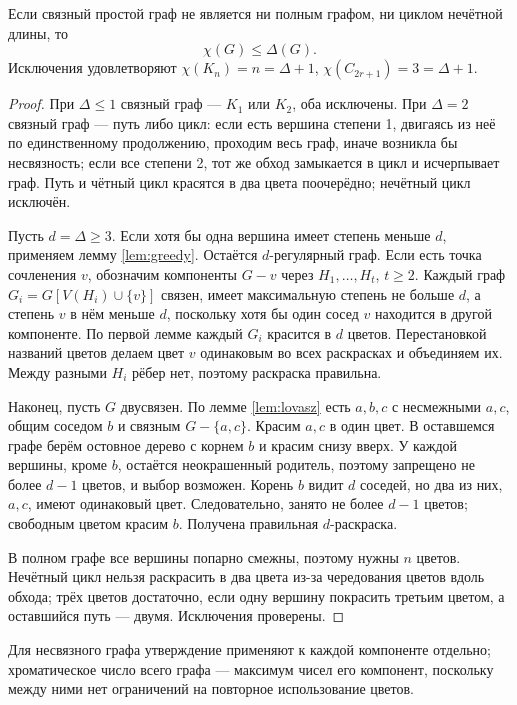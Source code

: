 \begin{theorem}[Брукс]
Если связный простой граф не является ни полным графом,
ни циклом нечётной длины, то
\[
 \boxed{\chi(G)\le\Delta(G).}
\]
Исключения удовлетворяют \(\chi(K_n)=n=\Delta+1\),
\(\chi(C_{2r+1})=3=\Delta+1\).
\end{theorem}
\begin{proof}
При \(\Delta\le1\) связный граф — \(K_1\) или \(K_2\), оба исключены.
При \(\Delta=2\) связный граф — путь либо цикл:
если есть вершина степени 1, двигаясь из неё по единственному продолжению,
проходим весь граф, иначе возникла бы несвязность; если все степени 2,
тот же обход замыкается в цикл и исчерпывает граф.
Путь и чётный цикл красятся в два цвета поочерёдно;
нечётный цикл исключён.

Пусть \(d=\Delta\ge3\). Если хотя бы одна вершина имеет степень меньше
\(d\), применяем лемму \ref{lem:greedy}. Остаётся \(d\)-регулярный граф.
Если есть точка сочленения \(v\), обозначим компоненты \(G-v\) через
\(H_1,\ldots,H_t\), \(t\ge2\). Каждый граф \(G_i=G[V(H_i)\cup\{v\}]\)
связен, имеет максимальную степень не больше \(d\), а степень \(v\)
в нём меньше \(d\), поскольку хотя бы один сосед \(v\) находится
в другой компоненте. По первой лемме каждый \(G_i\) красится
в \(d\) цветов. Перестановкой названий цветов делаем цвет \(v\)
одинаковым во всех раскрасках и объединяем их. Между разными \(H_i\)
рёбер нет, поэтому раскраска правильна.

Наконец, пусть \(G\) двусвязен. По лемме \ref{lem:lovasz} есть
\(a,b,c\) с несмежными \(a,c\), общим соседом \(b\) и связным
\(G-\{a,c\}\). Красим \(a,c\) в один цвет. В оставшемся графе
берём остовное дерево с корнем \(b\) и красим снизу вверх.
У каждой вершины, кроме \(b\), остаётся неокрашенный родитель,
поэтому запрещено не более \(d-1\) цветов, и выбор возможен.
Корень \(b\) видит \(d\) соседей, но два из них, \(a,c\), имеют
одинаковый цвет. Следовательно, занято не более \(d-1\) цветов;
свободным цветом красим \(b\). Получена правильная \(d\)-раскраска.

В полном графе все вершины попарно смежны, поэтому нужны \(n\) цветов.
Нечётный цикл нельзя раскрасить в два цвета из-за чередования цветов
вдоль обхода; трёх цветов достаточно, если одну вершину покрасить
третьим цветом, а оставшийся путь — двумя. Исключения проверены.
\end{proof}


Для несвязного графа утверждение применяют к каждой компоненте отдельно;
хроматическое число всего графа — максимум чисел его компонент, поскольку
между ними нет ограничений на повторное использование цветов.
